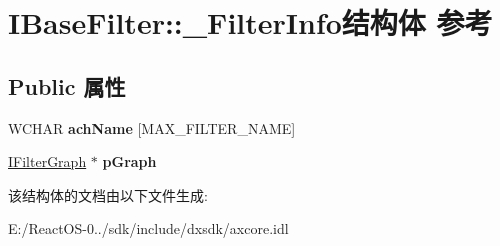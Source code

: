 \hypertarget{struct_i_base_filter_1_1___filter_info}{}\section{I\+Base\+Filter\+:\+:\+\_\+\+Filter\+Info结构体 参考}
\label{struct_i_base_filter_1_1___filter_info}
\subsection*{Public 属性}
\begin{DoxyCompactItemize}
\item 
\mbox{\label{struct_i_base_filter_1_1___filter_info_ae371f10924f3551677cb0729ad10fc5c}} 
W\+C\+H\+AR {\bfseries ach\+Name} \mbox{[}M\+A\+X\+\_\+\+F\+I\+L\+T\+E\+R\+\_\+\+N\+A\+ME\mbox{]}
\item 
\mbox{\label{struct_i_base_filter_1_1___filter_info_a9390ae1a2802e18ec67cc0d9d1aacd58}} 
\hyperlink{interface_i_filter_graph}{I\+Filter\+Graph} $\ast$ {\bfseries p\+Graph}
\end{DoxyCompactItemize}


该结构体的文档由以下文件生成\+:\begin{DoxyCompactItemize}
\item 
E\+:/\+React\+O\+S-\/0../sdk/include/dxsdk/axcore.\+idl\end{DoxyCompactItemize}
